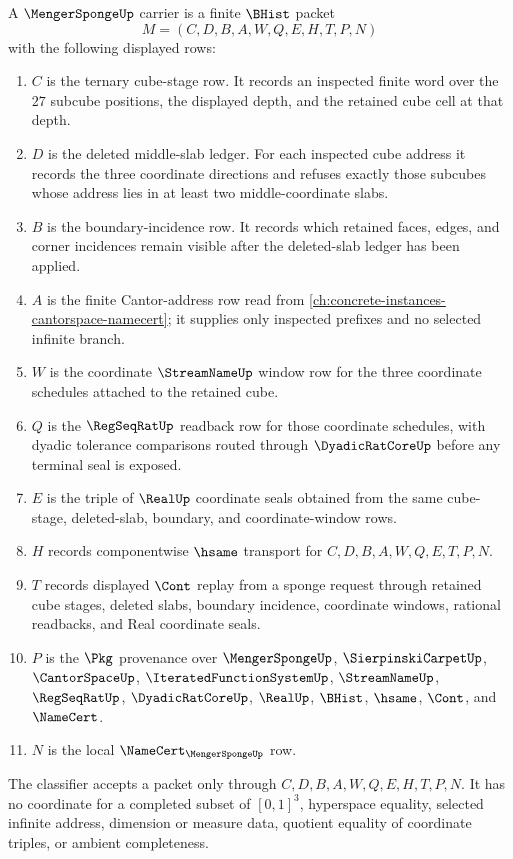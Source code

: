 \begin{definition}
\label{def:menger-sponge-carrier}
A $\MengerSpongeUp$ carrier is a finite $\BHist$ packet
$$
M=(C,D,B,A,W,Q,E,H,T,P,N)
$$
with the following displayed rows:
\begin{enumerate}
\item $C$ is the ternary cube-stage row. It records an inspected finite word over the $27$ subcube positions, the displayed depth, and the retained cube cell at that depth.
\item $D$ is the deleted middle-slab ledger. For each inspected cube address it records the three coordinate directions and refuses exactly those subcubes whose address lies in at least two middle-coordinate slabs.
\item $B$ is the boundary-incidence row. It records which retained faces, edges, and corner incidences remain visible after the deleted-slab ledger has been applied.
\item $A$ is the finite Cantor-address row read from \autoref{ch:concrete-instances-cantorspace-namecert}; it supplies only inspected prefixes and no selected infinite branch.
\item $W$ is the coordinate $\StreamNameUp$ window row for the three coordinate schedules attached to the retained cube.
\item $Q$ is the $\RegSeqRatUp$ readback row for those coordinate schedules, with dyadic tolerance comparisons routed through $\DyadicRatCoreUp$ before any terminal seal is exposed.
\item $E$ is the triple of $\RealUp$ coordinate seals obtained from the same cube-stage, deleted-slab, boundary, and coordinate-window rows.
\item $H$ records componentwise $\hsame$ transport for $C,D,B,A,W,Q,E,T,P,N$.
\item $T$ records displayed $\Cont$ replay from a sponge request through retained cube stages, deleted slabs, boundary incidence, coordinate windows, rational readbacks, and Real coordinate seals.
\item $P$ is the $\Pkg$ provenance over $\MengerSpongeUp$, $\SierpinskiCarpetUp$, $\CantorSpaceUp$, $\IteratedFunctionSystemUp$, $\StreamNameUp$, $\RegSeqRatUp$, $\DyadicRatCoreUp$, $\RealUp$, $\BHist$, $\hsame$, $\Cont$, and $\NameCert$.
\item $N$ is the local $\NameCert_{\MengerSpongeUp}$ row.
\end{enumerate}
The classifier accepts a packet only through $C,D,B,A,W,Q,E,H,T,P,N$. It has no coordinate for a completed subset of $[0,1]^3$, hyperspace equality, selected infinite address, dimension or measure data, quotient equality of coordinate triples, or ambient completeness.
\end{definition}

